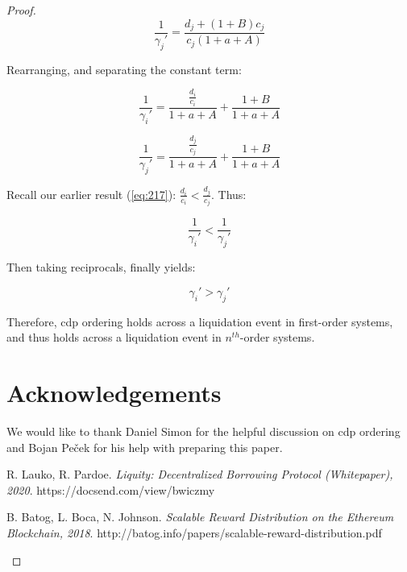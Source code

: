 \documentclass[reqno]{article}
\begin{document}
\begin{proof}
\begin{equation} 
    \frac{1}{\gamma_{j}'}=\frac{d_j+\left(1+B\right)c_j}{c_j\left(1+a+A\right)}
\end{equation}

\bigskip
Rearranging, and separating the constant term:

\begin{equation} 
    \frac{1}{\gamma_{i}'}=\frac{\frac{d_i}{c_i}}{1+a+A}+\frac{1+B}{1+a+A}
\end{equation}

\begin{equation} 
    \frac{1}{\gamma_{j}'}=\frac{\frac{d_j}{c_j}}{1+a+A}+\frac{1+B}{1+a+A}
\end{equation}

\bigskip
Recall our earlier result (\ref{eq:217}): $\frac{d_i}{c_i}<\frac{d_j}{c_j}$. Thus:

\begin{equation} 
    \frac{1}{\gamma_{i}'} < \frac{1}{\gamma_{j}'}
\end{equation}

\bigskip
Then taking reciprocals, finally yields:

\begin{equation} 
    \gamma_{i}' > \gamma_{j}'
\end{equation}

\bigskip
Therefore, cdp ordering holds across a liquidation event in first-order systems, and thus holds across a liquidation event in $n^{th}$-order systems.

\bigskip

\section{Acknowledgements}
We would like to thank Daniel Simon for the helpful discussion on cdp ordering and Bojan Peček for his help with preparing this paper.

\begin{thebibliography}{9}

R. Lauko, R. Pardoe. 
\textit{Liquity: Decentralized Borrowing Protocol (Whitepaper), 2020}. 
https://docsend.com/view/bwiczmy

B. Batog, L. Boca, N. Johnson.
\textit{Scalable Reward Distribution on the Ethereum Blockchain, 2018}. 
http://batog.info/papers/scalable-reward-distribution.pdf


\end{thebibliography}


\end{proof}
\end{document}
